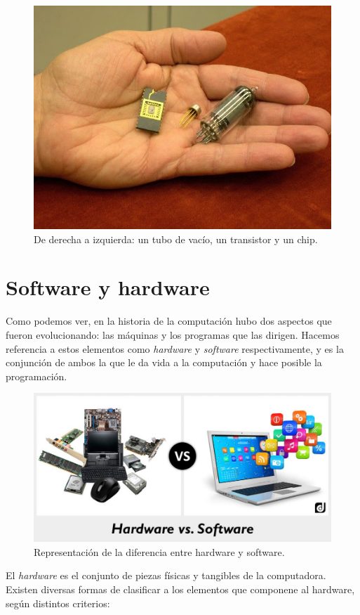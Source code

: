 \documentclass[
]{book}
\begin{document}
\begin{figure}

{\centering \includegraphics[width=0.5\linewidth]{images/historia/05_tubovacio_transistor_chip} 

}

\caption{De derecha a izquierda: un tubo de vacío, un transistor y un chip.}\label{fig:evolucion}
\end{figure}

\hypertarget{software-y-hardware}{%
\section{Software y hardware}\label{software-y-hardware}}

Como podemos ver, en la historia de la computación hubo dos aspectos que fueron evolucionando: las máquinas y los programas que las dirigen. Hacemos referencia a estos elementos como \emph{hardware} y \emph{software} respectivamente, y es la conjunción de ambos la que le da vida a la computación y hace posible la programación.

\begin{figure}

{\centering \includegraphics[width=0.5\linewidth]{images/intro/06_hardsoft} 

}

\caption{Representación de la diferencia entre hardware y software.}\label{fig:hardvssoft}
\end{figure}

El \emph{hardware} es el conjunto de piezas físicas y tangibles de la computadora. Existen diversas formas de clasificar a los elementos que componene al hardware, según distintos criterios:
\end{document}
